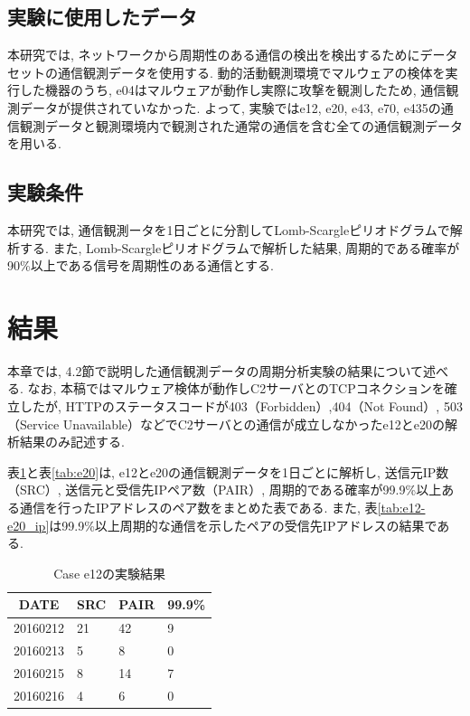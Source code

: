 \documentclass[twocolumn,9pt]{ltjsarticle}
\begin{document}
\subsection{実験に使用したデータ}
本研究では, ネットワークから周期性のある通信の検出を検出するためにデータセットの通信観測データを使用する. 動的活動観測環境でマルウェアの検体を実行した機器のうち, e04はマルウェアが動作し実際に攻撃を観測したため, 通信観測データが提供されていなかった. よって, 実験ではe12, e20, e43, e70, e435の通信観測データと観測環境内で観測された通常の通信を含む全ての通信観測データを用いる. 

\subsection{実験条件}
本研究では, 通信観測ータを1日ごとに分割してLomb-Scargleピリオドグラムで解析する. また, Lomb-Scargleピリオドグラムで解析した結果, 周期的である確率が90\%以上である信号を周期性のある通信とする. 

\section{結果}
本章では, 4.2節で説明した通信観測データの周期分析実験の結果について述べる. なお, 本稿ではマルウェア検体が動作しC2サーバとのTCPコネクションを確立したが, HTTPのステータスコードが403（Forbidden）,404（Not Found）, 503（Service Unavailable）などでC2サーバとの通信が成立しなかったe12とe20の解析結果のみ記述する. 

表\ref{tab:e12}と表\ref{tab:e20}は, e12とe20の通信観測データを1日ごとに解析し, 送信元IP数（SRC）, 送信元と受信先IPペア数（PAIR）, 周期的である確率が99.9\%以上ある通信を行ったIPアドレスのペア数をまとめた表である. また, 表\ref{tab:e12-e20_ip}は99.9\%以上周期的な通信を示したペアの受信先IPアドレスの結果である. 

\begin{table}[htbp]
    \centering
    \caption{Case e12の実験結果}

    \begin{tabular}{c||lll}
        \hline
        DATE & SRC & PAIR & 99.9\% \\
        \hline \hline
        20160212  & 21 & 42 & 9 \\
        20160213  & 5  & 8  & 0 \\
        20160215  & 8  & 14 & 7 \\
        20160216  & 4  & 6  & 0 \\
        \hline
    \end{tabular}

    \label{tab:e12}
\end{table}
\end{document}
